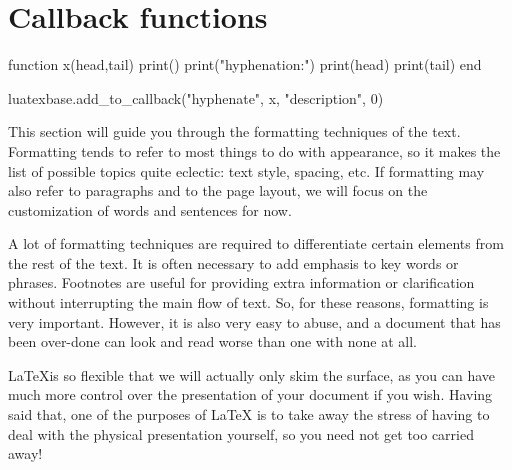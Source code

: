 \documentclass{article}
\begin{document}
\section*{Callback functions}

\begin{luacode*}
function x(head,tail)
    print()
    print("hyphenation:")
    print(head)
    print(tail)
end

luatexbase.add_to_callback("hyphenate", x, "description", 0)

\end{luacode*}

This section will guide you through the formatting techniques of the text. Formatting tends to refer to most things to do with appearance, so it makes the list of possible topics quite eclectic: text style, spacing, etc. If formatting may also refer to paragraphs and to the page layout, we will focus on the customization of words and sentences for now.

A lot of formatting techniques are required to differentiate certain elements from the rest of the text. It is often necessary to add emphasis to key words or phrases. Footnotes are useful for providing extra information or clarification without interrupting the main flow of text. So, for these reasons, formatting is very important. However, it is also very easy to abuse, and a document that has been over-done can look and read worse than one with none at all.

\LaTeX is so flexible that we will actually only skim the surface, as you can have much more control over the presentation of your document if you wish. Having said that, one of the purposes of LaTeX is to take away the stress of having to deal with the physical presentation yourself, so you need not get too carried away!
\end{document}
